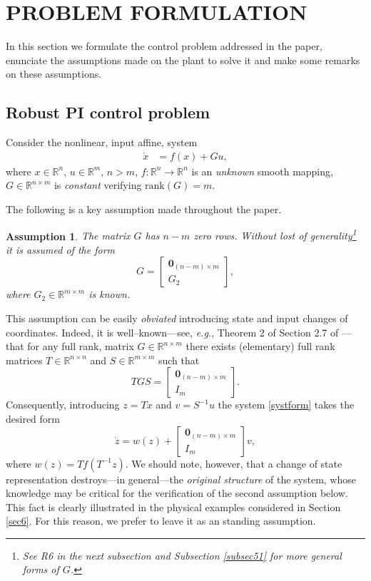 \documentclass[10pt, conference]{ieeeconf}
\newtheorem{assumption}{Assumption}
\def\rea{\mathbb{R}}
\def\rank{\mbox{rank}}
\def\begequ{\begin{equation}}
\def\endequ{\end{equation}}
\def\lab{\label}
\begin{document}
\section{PROBLEM FORMULATION}
\lab{sec2}	
In this section we formulate the control problem addressed in the paper, enunciate the assumptions made on the plant to solve it and make some remarks on these assumptions.
\subsection{Robust PI control problem}
\lab{subsec21}	
Consider the nonlinear, input affine, system
\begin{align}
	\dot x &= f(x) + G u, \label{systform}
\end{align}
where $x\in \mathbb{R}^n$, $u\in\mathbb{R}^m$, $n >m$, $f: \mathbb{R}^n \to \mathbb{R}^n$ is an {\em unknown} smooth mapping, $G\in\mathbb{R}^{n\times m}$ is {\em constant} verifying $\rank(G)= m$.

The following is a key assumption made throughout the paper.

\begin{assumption} 
\label{as:g}
The matrix $G$ has $n-m$ zero rows. Without lost of generality\footnote{See R6 in the next subsection and Subsection \ref{subsec51} for more general forms of $G$.} it is assumed of the form
\begequ
\lab{g}
	G=\begin{bmatrix} \mathbf{0}_{(n-m)\times m} \\ G_2\end{bmatrix},
\endequ
where $G_2 \in \mathbb{R}^{m \times m}$ is {\em known}.
\end{assumption}

This assumption can be easily {\em obviated} introducing state and input changes of coordinates. Indeed, it is well--known---see, {\em e.g.}, Theorem 2 of Section 2.7 of \cite{LANTIS}---that for any full rank, matrix $G\in\mathbb{R}^{n\times m}$ there exists (elementary) full rank matrices $T \in \rea^{n \times n}$ and  $S \in \rea^{m \times m}$ such that
$$
T G S = \begin{bmatrix} \mathbf{0}_{(n-m)\times m} \\ I_m\end{bmatrix}.
$$
Consequently, introducing $z = Tx$ and $v=S^{-1}u$ the system \eqref{systform} takes the desired form
$$
\dot z = w(z) + \begin{bmatrix} \mathbf{0}_{(n-m)\times m} \\ I_m\end{bmatrix}v,
$$
where $w(z)=Tf(T^{-1}z)$. We should note, however, that a change of state representation destroys---in general---the {\em original structure} of the system, whose knowledge may be critical for the verification of the second assumption below. This fact is clearly illustrated in the physical examples considered in Section \ref{sec6}. For this reason, we prefer to leave it as an standing assumption. 
\end{document}
